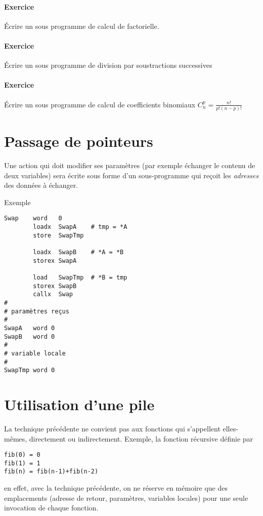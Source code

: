 \documentclass[10pt]{article}
\begin{document}
\paragraph{Exercice} Écrire un sous programme de calcul de factorielle.


\paragraph{Exercice} Écrire un sous programme de division par soustractions successives

\paragraph{Exercice} Écrire un sous programme de calcul de coefficients binomiaux  $C^p_n = \frac{n !}{p! (n-p)!}$


\section{Passage de pointeurs}

Une action qui doit modifier ses paramètres (par exemple
échanger le contenu de deux variables) sera écrite sous forme
d'un sous-programme qui reçoit les \emph{adresses} des
données à échanger.

Exemple
\begin{lstlisting}
Swap    word   0
        loadx  SwapA    # tmp = *A
        store  SwapTmp

        loadx  SwapB    # *A = *B
        storex SwapA

        load   SwapTmp  # *B = tmp
        storex SwapB
        callx  Swap
#
# paramètres reçus
#
SwapA   word 0
SwapB   word 0
#
# variable locale
#
SwapTmp word 0

\end{lstlisting}

\section{Utilisation d'une pile}

La technique précédente ne convient pas aux fonctions qui s'appellent
elles-mêmes, directement ou indirectement. Exemple, la fonction
récursive définie par 
\begin{verbatim}
fib(0) = 0
fib(1) = 1
fib(n) = fib(n-1)+fib(n-2)
\end{verbatim}
 
en effet, avec la technique précédente, on ne réserve en
mémoire que des emplacements (adresse de retour, paramètres, variables
locales) pour une seule invocation de chaque fonction.
\end{document}
